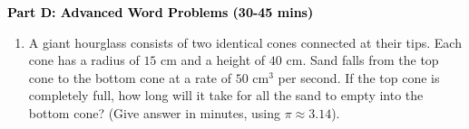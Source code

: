 \documentclass[12pt, letterpaper, fleqn]{article}
\begin{document}
\newpage

\begin{tcolorbox}[colback=customteal!20]
\large\textcolor{black}{\textbf{Part D: Advanced Word Problems (30-45 mins)}}
\end{tcolorbox}

\vspace{3mm}

\begin{enumerate}[itemsep=5.5cm, leftmargin=0.6cm, resume]
\item A giant hourglass consists of two identical cones connected at their tips. Each cone has a radius of $15\text{ cm}$ and a height of $40\text{ cm}$. Sand falls from the top cone to the bottom cone at a rate of $50\text{ cm}^3$ per second. If the top cone is completely full, how long will it take for all the sand to empty into the bottom cone? (Give answer in minutes, using $\pi \approx 3.14$).
\end{enumerate}
\end{document}
